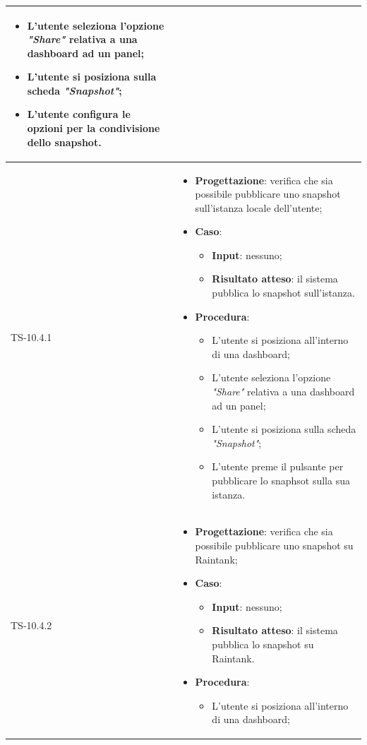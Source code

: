 \begin{longtable}{|C{2.5cm}|C{13cm}|}
\begin{itemize}
\begin{itemize}
		\item L'utente seleziona l'opzione \emph{"Share"} relativa a una dashboard ad un panel;
		\item L'utente si posiziona sulla scheda \emph{"Snapshot"};
		\item L'utente configura le opzioni per la condivisione dello snapshot.
	\end{itemize} 
\end{itemize}
	 \\
	\hline
	{TS-10.4.1} &
\begin{itemize}
	\item \textbf{Progettazione}: verifica che sia possibile pubblicare uno
	snapshot sull'istanza locale dell'utente;
	\item \textbf{Caso}: 
	\begin{itemize}
		\item \textbf{Input}: nessuno;
		\item \textbf{Risultato atteso}: il sistema pubblica lo snapshot sull'istanza.
	\end{itemize}
	\item \textbf{Procedura}:
	\begin{itemize}
		\item L'utente si posiziona all'interno di una dashboard;
		\item L'utente seleziona l'opzione \emph{"Share"} relativa a una dashboard ad un panel;
		\item L'utente si posiziona sulla scheda \emph{"Snapshot"};
		\item L'utente preme il pulsante per pubblicare lo snaphsot sulla sua istanza.
	\end{itemize} 
\end{itemize}
	  \\
	\hline
	{TS-10.4.2} & 
\begin{itemize}
	\item \textbf{Progettazione}: verifica che sia possibile pubblicare uno
	snapshot su Raintank;
	\item \textbf{Caso}: 
	\begin{itemize}
		\item \textbf{Input}: nessuno;
		\item \textbf{Risultato atteso}: il sistema pubblica lo snapshot su Raintank.
	\end{itemize}
	\item \textbf{Procedura}:
	\begin{itemize}
		\item L'utente si posiziona all'interno di una dashboard;

\end{itemize}
\end{itemize}
\end{longtable}
